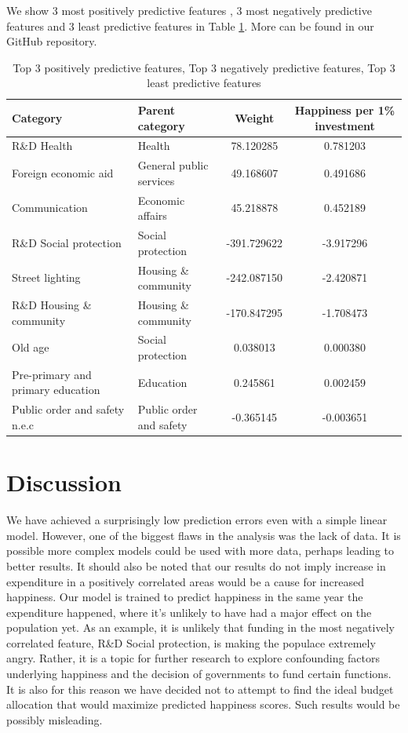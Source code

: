\documentclass{article}
\begin{document}
We show 3 most positively predictive features , 3 most negatively predictive features and 3 least predictive features in Table \ref{pospredfts}. More can be found in our GitHub repository.

\begin{table}[h]
\centering
\begin{tabular}{|l|l|c|c|} \toprule
Category & Parent category & Weight & Happiness per 1\% investment  \\ \midrule
R\&D Health & Health & 78.120285 & 0.781203 \\
Foreign economic aid & General public services & 49.168607 & 0.491686 \\
Communication & Economic affairs & 45.218878 & 0.452189 \\
R\&D Social protection & Social protection & -391.729622 & -3.917296 \\
Street lighting & Housing \& community & -242.087150 & -2.420871 \\
R\&D Housing \& community & Housing \& community& -170.847295 & -1.708473 \\
Old age & Social protection & 0.038013 & 0.000380 \\
Pre-primary and primary education & Education & 0.245861 & 0.002459 \\
Public order and safety n.e.c & Public order and safety & -0.365145 & -0.003651 \\ \bottomrule
\end{tabular}
\caption{Top 3 positively predictive features, Top 3 negatively predictive features, Top 3 least predictive features}
\label{pospredfts}
\end{table}

\section{Discussion}
We have achieved a surprisingly low prediction errors even with a simple linear model. However, one of the biggest flaws in the analysis was the lack of data.
It is possible more complex models could be used with more data, perhaps leading to better results. It should also be noted that our results do not imply increase in expenditure in a positively correlated areas would be a cause for increased happiness. Our model is trained to predict happiness in the same year the expenditure happened, where it's unlikely to have had a major effect on the population yet. As an example, it is unlikely that funding in the most negatively correlated feature, R\&D Social protection, is making the populace extremely angry. Rather, it is a topic for further research to explore confounding factors underlying happiness and the decision of governments to fund certain functions. It is also for this reason we have decided not to attempt to find the ideal budget allocation that would maximize predicted happiness scores. Such results would be possibly misleading.




\end{document}
